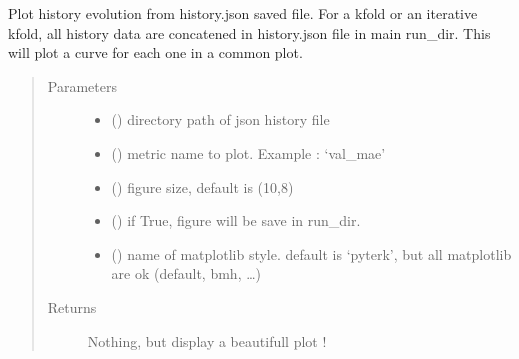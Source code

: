 \documentclass[letterpaper,10pt,english]{sphinxmanual}
\begin{document}
\begin{fulllineitems}
\label{\detokenize{PyTerK:pyterk.reporter.plot_history}}
\sphinxAtStartPar
Plot history evolution from history.json saved file.
For a kfold or an iterative kfold, all history data are concatened in history.json file in main run\_dir.
This will plot a curve for each one in a common plot.
\begin{quote}\begin{description}
\item[{Parameters}] \leavevmode\begin{itemize}
\item {} 
\sphinxAtStartPar
{} () \textendash{} directory path of json history file

\item {} 
\sphinxAtStartPar
{} () \textendash{} metric name to plot. Example : ‘val\_mae’

\item {} 
\sphinxAtStartPar
{} () \textendash{} figure size, default is (10,8)

\item {} 
\sphinxAtStartPar
{} () \textendash{} if True, figure will be save in run\_dir.

\item {} 
\sphinxAtStartPar
{} () \textendash{} name of matplotlib style. default is ‘pyterk’, but all matplotlib are ok (default, bmh, …)

\end{itemize}

\item[{Returns}] \leavevmode
\sphinxAtStartPar
Nothing, but display a beautifull plot !

\end{description}\end{quote}

\end{fulllineitems}
\end{document}
